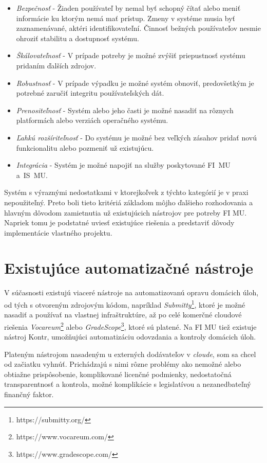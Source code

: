 \documentclass[
  digital, %
  oneside, %
  table,   %
  lof,     %
  lot,   %
]{fithesis3}
\begin{document}
\begin{itemize}
    \item \textit{Bezpečnosť} - Žiaden používateľ by nemal byť schopný čítať alebo meniť informácie ku ktorým nemá mať prístup. Zmeny v systéme musia byť zaznamenávané, aktéri identifikovateľní. Činnosť bežných používateľov nesmie ohroziť stabilitu a dostupnosť systému.
    \item \textit{Škálovateľnosť} - V prípade potreby je možné zvýšiť priepustnosť systému pridaním ďalších zdrojov.
    \item \textit{Robustnosť} - V prípade výpadku je možné systém obnoviť, predovšetkým je potrebné zaručiť integritu používateľských dát.  
    \item \textit{Prenositeľnosť} - Systém alebo jeho časti je možné nasadiť na rôznych platformách alebo verziách operačného systému.
    \item \textit{Ľahkú rozšíriteľnosť} - Do systému je možné bez veľkých zásahov pridať novú funkcionalitu alebo pozmeniť už existujúcu.
    \item \textit{Integrácia} - Systém je možné napojiť na služby poskytované FI~MU a~IS~MU.
\end{itemize}

Systém s výraznými nedostatkami v ktorejkoľvek z týchto kategórií je v praxi nepoužiteľný. Preto boli tieto kritériá základom môjho ďalšieho rozhodovania a hlavným dôvodom zamietnutia už existujúcich nástrojov pre potreby FI MU. Napriek tomu je podstatné uviesť existujúce riešenia a predstaviť dôvody implementácie vlastného projektu.

\section{Existujúce automatizačné nástroje}

V súčasnosti existujú viaceré nástroje na automatizovanú opravu domácich úloh, od tých s otvoreným zdrojovým kódom, napríklad  \textit{Submitty}\footnote{https://submitty.org/}, ktoré je možné nasadiť a používať na vlastnej infraštruktúre, až po celé komerčné cloudové riešenia \textit{Vocareum}\footnote{https://www.vocareum.com/} alebo \textit{GradeScope}\footnote{https://www.gradescope.com/}, ktoré sú platené. Na FI MU tiež existuje nástroj Kontr, umožňujúci automatizáciu odovzdania a kontroly domácich úloh.

Plateným nástrojom nasadeným u externých dodávateľov v \emph{cloude}, som sa chcel od začiatku vyhnúť. Prichádzajú s nimi rôzne problémy ako nemožné alebo obtiažne prispôsobenie, komplikované licenčné podmienky, nedostatočná transparentnosť a kontrola, možné komplikácie s legislatívou a nezanedbateľný finančný faktor.
\end{document}
